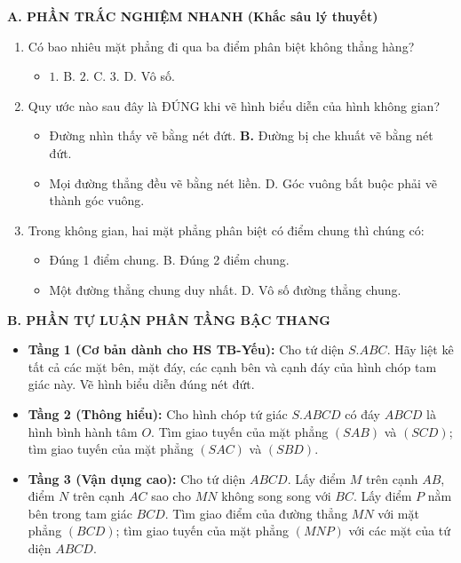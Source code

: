 \documentclass[12pt, a4paper]{article}
\begin{document}
\noindent \textbf{A. PHẦN TRẮC NGHIỆM NHANH (Khắc sâu lý thuyết)}
\begin{enumerate}[leftmargin=0.6cm]
    \item Có bao nhiêu mặt phẳng đi qua ba điểm phân biệt không thẳng hàng?
    \begin{itemize}[leftmargin=0.6cm]
        \item[\textbf{A.}] $1$. \quad B. $2$. \quad C. $3$. \quad D. Vô số.
    \end{itemize}
    \item Quy ước nào sau đây là ĐÚNG khi vẽ hình biểu diễn của hình không gian?
    \begin{itemize}[leftmargin=0.6cm]
        \item[A.] Đường nhìn thấy vẽ bằng nét đứt. \quad \textbf{B.} Đường bị che khuất vẽ bằng nét đứt.
        \item[C.] Mọi đường thẳng đều vẽ bằng nét liền. \quad D. Góc vuông bắt buộc phải vẽ thành góc vuông.
    \end{itemize}
    \item Trong không gian, hai mặt phẳng phân biệt có điểm chung thì chúng có:
    \begin{itemize}[leftmargin=0.6cm]
        \item[A.] Đúng 1 điểm chung. \quad B. Đúng 2 điểm chung.
        \item[\textbf{C.}] Một đường thẳng chung duy nhất. \quad D. Vô số đường thẳng chung.
    \end{itemize}
\end{enumerate}

\noindent \textbf{B. PHẦN TỰ LUẬN PHÂN TẦNG BẬC THANG}
\begin{itemize}[leftmargin=0.6cm]
    \item \textbf{Tầng 1 (Cơ bản dành cho HS TB-Yếu):} Cho tứ diện $S.ABC$. Hãy liệt kê tất cả các mặt bên, mặt đáy, các cạnh bên và cạnh đáy của hình chóp tam giác này. Vẽ hình biểu diễn đúng nét đứt.
    \item \textbf{Tầng 2 (Thông hiểu):} Cho hình chóp tứ giác $S.ABCD$ có đáy $ABCD$ là hình bình hành tâm $O$. Tìm giao tuyến của mặt phẳng $(SAB)$ và $(SCD)$; tìm giao tuyến của mặt phẳng $(SAC)$ và $(SBD)$.
    \item \textbf{Tầng 3 (Vận dụng cao):} Cho tứ diện $ABCD$. Lấy điểm $M$ trên cạnh $AB$, điểm $N$ trên cạnh $AC$ sao cho $MN$ không song song với $BC$. Lấy điểm $P$ nằm bên trong tam giác $BCD$. Tìm giao điểm của đường thẳng $MN$ với mặt phẳng $(BCD)$; tìm giao tuyến của mặt phẳng $(MNP)$ với các mặt của tứ diện $ABCD$.
\end{itemize}
\end{document}
